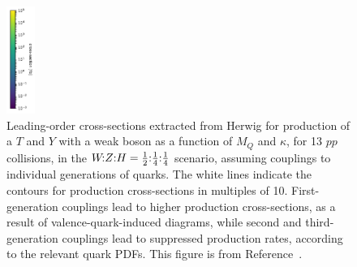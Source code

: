 \begin{figure}[t]
    \includegraphics[height=3.5cm]{Figures/VLQ/xsScans/3rdGen/cbar.pdf} %
    \caption{Leading-order cross-sections extracted from Herwig for production of a $T$ and $Y$
      with a weak boson as a function of $M_Q$ and $\kappa$, for \unit{13}{\TeV} $pp$
      collisions, in the $\text{$W\!$:$Z$:$H$} = \text{$\tfrac{1}{2}$:$\tfrac{1}{4}$:$\tfrac{1}{4}$}$ scenario, assuming couplings to individual
      generations of quarks.  The white lines indicate the contours for production
      cross-sections in multiples of 10. First-generation couplings lead to higher
      production cross-sections, as a result of valence-quark-induced diagrams,
      while second and third-generation couplings lead to suppressed production
      rates, according to the relevant quark PDFs. This figure is from Reference~\cite{VLQ_contur}.}
    \label{fig:QVproduction}
\end{figure}
